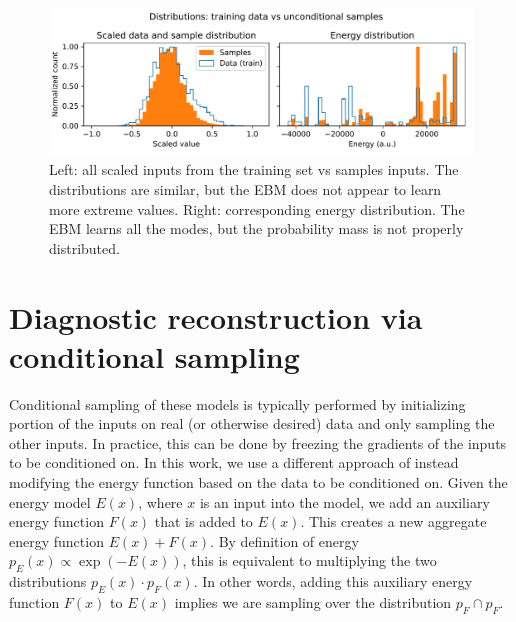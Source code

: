 \begin{figure}
	\centering
	\includegraphics[width=\linewidth]{figures/uncond_histograms_merged_energy-dist_39-0}
	\caption[Histograms of scaled values and energy for unconditional samples]{\label{fig:uncond_energy}Left: all scaled inputs from the training set vs samples inputs. The distributions are similar, but the EBM does not appear to learn more extreme values. Right: corresponding energy distribution. The EBM learns all the modes, but the probability mass is not properly distributed.}
\end{figure}

\section{Diagnostic reconstruction via conditional sampling}

Conditional sampling of these models is typically performed by initializing portion of the inputs on real (or otherwise desired) data and only sampling the other inputs. In practice, this can be done by freezing the gradients of the inputs to be conditioned on. In this work, we use a different approach of instead modifying the energy function based on the data to be conditioned on. Given the energy model $E(x)$, where $x$ is an input into the model, we add an auxiliary energy function $F(x)$ that is added to $E(x)$. This creates a new aggregate energy function $E(x) + F(x)$. By definition of energy $p_E(x) \propto \exp(-E(x))$, this is equivalent to multiplying the two distributions $p_E(x) \cdot p_F(x)$. In other words, adding this auxiliary energy function $F(x)$ to $E(x)$ implies we are sampling over the distribution $p_F \cap p_F$.

